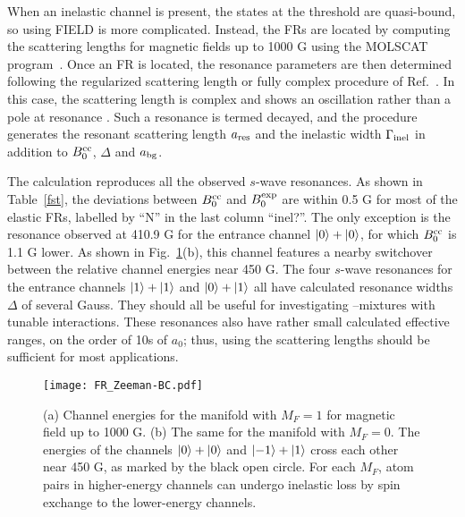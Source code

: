 When an inelastic channel is present, the states at the threshold are quasi-bound, so using FIELD is more complicated. Instead, the FRs are located by computing the scattering lengths for magnetic fields up to 1000 G using the MOLSCAT program~\cite{molscat:2019,mbf-github:2020}. Once an FR is located, the resonance parameters are then determined following the regularized scattering length or fully complex procedure of Ref.~\cite{Frye2017}. In this case, the scattering length is complex and shows an oscillation rather than a pole at resonance \cite{Hutson:res:2007}. Such a resonance is termed decayed, and the procedure generates the resonant scattering length $a_{\rm res}$ and the inelastic width $\Gamma_{\rm inel}$ in addition to $B_0^{\rm cc}$, $\Delta$ and $a_{\rm bg}$.

The calculation reproduces all the observed $s$-wave resonances. As shown in Table~\ref{fst}, the deviations between $B_0^{\rm cc}$ and $B_0^{\rm exp}$ are within 0.5 G for most of the elastic FRs, labelled by ``N'' in the last column ``inel?''. The only exception is the resonance observed at 410.9 G for the entrance channel $\ket{0} + \ket{0}$, for which $B_0^{\rm cc}$ is 1.1 G lower. As shown in Fig.~\ref{FR_Zeeman-BC}(b), this channel features a nearby switchover between the relative channel energies near 450 G. The four $s$-wave resonances for the entrance channels $\ket{1}+\ket{1}$ and $\ket{0}+ \ket{1}$ all have calculated resonance widths $\Delta$ of several Gauss. They should all be useful for investigating \Na--\Rb mixtures with tunable interactions. These resonances also have rather small calculated effective ranges, on the order of 10s of $a_0$; thus, using the scattering lengths should be sufficient for most applications.

\begin{figure}[htb]
\begin{center}
\texttt{[image: FR\_Zeeman-BC.pdf]}
\end{center}
\caption[Zeeman energy for $M_F=1$ and $M_F=0$ channels]{(a) Channel energies for the manifold with $M_F = 1$ for magnetic field up to 1000 G. (b) The same for the manifold with $M_F = 0$. The energies of the channels $\ket{0}+\ket{0}$ and $\ket{-1}+\ket{1}$ cross each other near 450 G, as marked by the black open circle. For each $M_F$, atom pairs in higher-energy channels can undergo inelastic loss by spin exchange to the lower-energy channels.}
\label{FR_Zeeman-BC}
\end{figure}

